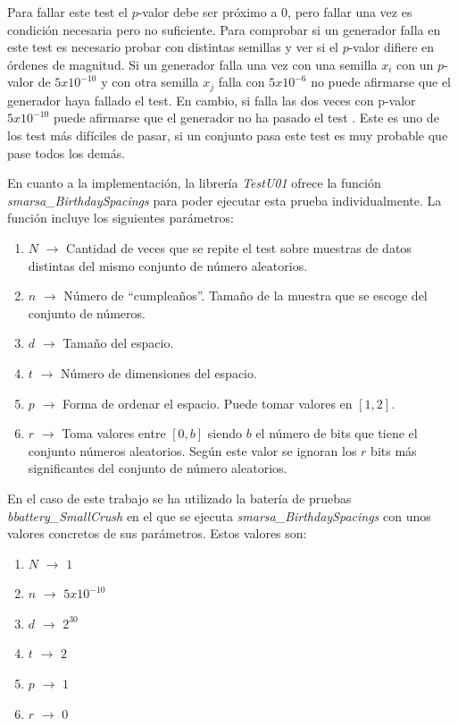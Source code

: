 \documentclass{article}
\begin{document}
Para fallar este test el $p$-valor debe ser próximo a $0$, pero fallar una vez es condición necesaria pero no suficiente. Para comprobar si un generador falla en este test es necesario probar con distintas semillas y ver si el $p$-valor difiere en órdenes de magnitud. Si un generador falla una vez con una semilla $x_i$ con un $p$-valor de $5x10^{-10}$ y con otra semilla $x_j$ falla con $5x10^{-6}$ no puede afirmarse que el generador haya fallado el test. En cambio, si falla las dos veces con p-valor $5x10^{-10}$ puede afirmarse que el generador no ha pasado el test \citet{mccullough_2006}. Este es uno de los test más difíciles de pasar, si un conjunto pasa este test es muy probable que pase todos los demás. 

En cuanto a la implementación, la librería \emph{TestU01} ofrece la función \textit{smarsa\_BirthdaySpacings} para poder ejecutar esta prueba individualmente. La función incluye los siguientes parámetros: 
\begin{enumerate}
    \item[] $N$ $\rightarrow$ Cantidad de veces que se repite el test sobre muestras de datos distintas del mismo conjunto de número aleatorios. 
    \item[] $n$ $\rightarrow$ Número de “cumpleaños”. Tamaño de la muestra que se escoge del conjunto de números. 
    \item[] $d$ $\rightarrow$ Tamaño del espacio. 
    \item[] $t$ $\rightarrow$ Número de dimensiones del espacio. 
    \item[] $p$ $\rightarrow$ Forma de ordenar el espacio. Puede tomar valores en $[1,2]$. 
    \item[] $r$ $\rightarrow$ Toma valores entre $[0,b]$ siendo $b$ el número de bits que tiene el conjunto números aleatorios. Según este valor se ignoran los $r$ bits más significantes del conjunto de número aleatorios. 
\end{enumerate}

En el caso de este trabajo se ha utilizado la batería de pruebas \textit{bbattery\_SmallCrush} en el que se ejecuta \textit{smarsa\_BirthdaySpacings} con unos valores concretos de sus parámetros. Estos valores son: 

\begin{enumerate}
    \item[] $N$ $\rightarrow$ $1$
    \item[] $n$ $\rightarrow$ $5x10^{-10}$
    \item[] $d$ $\rightarrow$ $2^{30}$
    \item[] $t$ $\rightarrow$ $2$
    \item[] $p$ $\rightarrow$ $1$
    \item[] $r$ $\rightarrow$ $0$
\end{enumerate}
\end{document}
